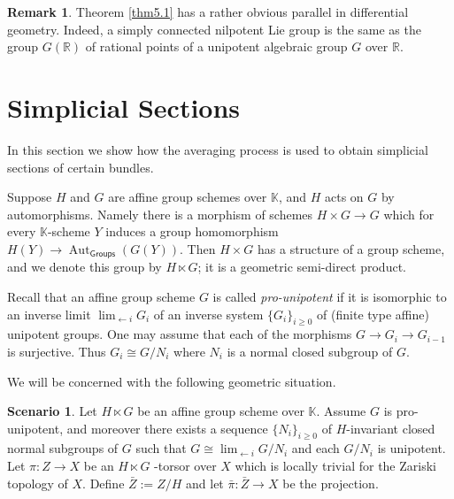 \documentclass[10pt]{amsart}
\theoremstyle{definition}
\newtheorem{rem}[equation]{Remark}
\newtheorem{sce}[equation]{Scenario}
\numberwithin{equation}{section}
\newcommand{\opn}{\operatorname}
\newcommand{\cat}[1]{\operatorname{\mathsf{#1}}}
\newcommand{\mbb}[1]{\mathbb{#1}}
\newcommand{\K}{\mbb{K}}
\begin{document}
\begin{rem}
Theorem \ref{thm5.1} has a rather obvious parallel in differential 
geometry. Indeed, a simply connected nilpotent Lie group is the 
same as the group $G(\mbb{R})$ of rational points of a unipotent 
algebraic group $G$ over $\mbb{R}$. 
\end{rem}





\section{Simplicial Sections}
\label{sec2}

In this section we show how the averaging process is used to 
obtain simplicial sections of certain bundles. 

Suppose $H$ and $G$ are affine group schemes over $\K$, and $H$ 
acts on $G$ by automorphisms. Namely there is a morphism of 
schemes $H \times G \to G$ which  for every $\K$-scheme $Y$ 
induces a group homomorphism
$H(Y) \to \opn{Aut}_{\cat{Groups}}(G(Y))$.
Then $H \times G$ has a structure of a group scheme, and we denote 
this group by $H \ltimes G$; it is a geometric semi-direct 
product. 

Recall that an affine group scheme $G$ is called
{\em pro-unipotent} if it is isomorphic to an inverse limit
$\lim_{\leftarrow i} G_i$ of an inverse system
$\{ G_i \}_{i \geq 0}$ of (finite type affine) unipotent groups. 
One may assume that each of the morphisms
$G \to G_{i} \to G_{i-1}$ is surjective. 
Thus $G_i \cong G / N_i$ where $N_i$ is a 
normal closed subgroup of $G$.

We will be concerned with the following geometric situation.

\begin{sce} \label{sce2.1}
Let $H \ltimes G$ be an affine group scheme over $\K$.
Assume $G$ is pro-unipotent, and moreover there exists a 
sequence $\{ N_i \}_{i \geq 0}$ of $H$-invariant 
closed normal subgroups of $G$ such that 
$G \cong \lim_{\leftarrow i} G / N_i$ and each 
$G / N_i$ is unipotent. Let $\pi : Z \to X$ be an 
$H \ltimes G$ -torsor over $X$ 
which is locally trivial for the Zariski 
topology of $X$. Define $\bar{Z} := Z / H$ and let 
$\bar{\pi} : \bar{Z} \to X$ be the projection.
\end{sce}
\end{document}
